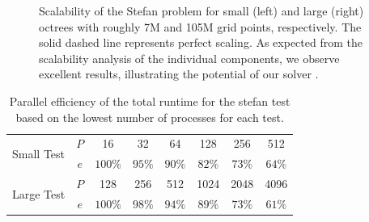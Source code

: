 \begin{figure}
\centering
{}
\caption{Scalability of the Stefan problem for small (left) and large (right) octrees with roughly 7M and 105M grid points, respectively. The solid dashed line represents perfect scaling. As expected from the scalability analysis of the individual components, we observe excellent results, illustrating the potential  of our solver .}
\label{fig:stefan_scaling}
\end{figure}

\begin{table}
\centering
	\begin{tabular}{|l|c|cccccc|}
	\hline
	\multirow{2}{*}{Small Test} & $P$ & 16      & 32      & 64      & 128     & 256    & 512 \\ 	                            
	                            & $e$ & $100\%$ & $95\%$  & $90\%$  & $82\%$  & $73\%$ & $64\%$ \\
	\hline
	\multirow{2}{*}{Large Test} & $P$ & 128     & 256     & 512     & 1024    & 2048   & 4096 \\ 	                            
	                            & $e$ & $100\%$ & $98\%$  & $94\%$  & $89\%$  & $73\%$ & $61\%$ \\
	\hline
	\end{tabular}
	\caption{Parallel efficiency of the total runtime for the stefan test based on the lowest number of processes for each test.}
	\label{tab:scaling_stefan} 
\end{table}

